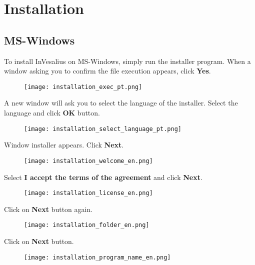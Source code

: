 \chapter{Installation}

\section{MS-Windows}


To install InVesalius on MS-Windows, simply run the installer program. When a window asking you to confirm the file execution appears, click \textbf{Yes}.

\begin{figure}[!htb]
\centering
\texttt{[image: installation\_exec\_pt.png]}
\end{figure}

\newpage

A new window will ask you to select the language of the installer. Select the language and click \textbf{OK} button.

\begin{figure}[!htb]
\centering
\texttt{[image: installation\_select\_language\_pt.png]}
\end{figure}
 
\hspace{.2cm}

Window installer appears. Click \textbf{Next}.


\begin{figure}[!htb]
\centering
\texttt{[image: installation\_welcome\_en.png]}
\end{figure}

\newpage

Select \textbf{I accept the terms of the agreement} and click \textbf{Next}.

\begin{figure}[!htb] 
\centering
\texttt{[image: installation\_license\_en.png]}
\end{figure}

\hspace{.2cm}

Click on \textbf{Next} button again. 

\begin{figure}[!htb]  
\centering
\texttt{[image: installation\_folder\_en.png]}
\end{figure}

\newpage

Click on \textbf{Next}  button.
\begin{figure}[!htb]
\centering
\texttt{[image: installation\_program\_name\_en.png]}
\end{figure}

